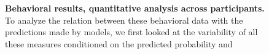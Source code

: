 \documentclass[10pt,letterpaper]{article}
\newcommand{\seeFig}[1]{Figure~\ref{fig:#1}}
\newcommand{\Rone}[1]{\textbf{\textcolor{magenta}{[rev 1: #1]}}}
\begin{document}
\begin{figure}%
\caption{%
\textbf{Behavioral results, quantitative analysis across participants.} %
To analyze the relation between these behavioral data with the predictions made by models,
we first looked at the variability of all these measures
conditioned on the predicted probability and
}
\end{figure}
\end{document}
